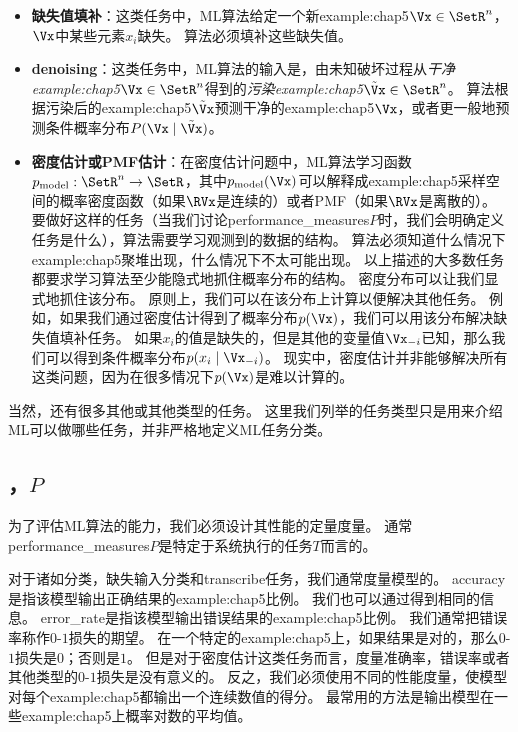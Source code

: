 \begin{itemize}
    \item \textbf{缺失值填补}：这类任务中，\gls{ML}算法给定一个新\gls{example:chap5}$\Vx\in\SetR^n$，$\Vx$中某些元素$x_i$缺失。
    算法必须填补这些缺失值。


    \item \textbf{\gls{denoising}}：这类任务中，\gls{ML}算法的输入是，由未知破坏过程从\emph{干净\gls{example:chap5}}$\Vx \in \SetR^n$得到的\emph{污染\gls{example:chap5}}$\tilde{\Vx} \in \SetR^n$。
    算法根据污染后的\gls{example:chap5}$\tilde{\Vx}$预测干净的\gls{example:chap5}$\Vx$，或者更一般地预测条件概率分布$P(\Vx\mid\tilde{\Vx})$。
    
    \item \textbf{密度估计}\textbf{或}\textbf{\gls{PMF}估计}：在密度估计问题中，\gls{ML}算法学习函数$p_{\text{model}}:\SetR^n \to \SetR$，其中$p_{\text{model}}(\Vx)$可以解释成\gls{example:chap5}采样空间的概率密度函数（如果$\RVx$是连续的）或者\gls{PMF}（如果$\RVx$是离散的）。
    要做好这样的任务（当我们讨论\gls{performance_measures}$P$时，我们会明确定义任务是什么），算法需要学习观测到的数据的结构。
    算法必须知道什么情况下\gls{example:chap5}聚堆出现，什么情况下不太可能出现。
    以上描述的大多数任务都要求学习算法至少能隐式地抓住概率分布的结构。
    密度分布可以让我们显式地抓住该分布。
    原则上，我们可以在该分布上计算以便解决其他任务。
    例如，如果我们通过密度估计得到了概率分布$p(\Vx)$，我们可以用该分布解决缺失值填补任务。
    如果$x_i$的值是缺失的，但是其他的变量值$\Vx_{-i}$已知，那么我们可以得到条件概率分布$p(x_i\mid\Vx_{-i})$。
    现实中，密度估计并非能够解决所有这类问题，因为在很多情况下$p(\Vx)$是难以计算的。
\end{itemize}

当然，还有很多其他或其他类型的任务。
这里我们列举的任务类型只是用来介绍\gls{ML}可以做哪些任务，并非严格地定义\gls{ML}任务分类。

\subsection{，$P$}
\label{sec:the_performance_measure_p}
为了评估\gls{ML}算法的能力，我们必须设计其性能的定量度量。
通常\gls{performance_measures}$P$是特定于系统执行的任务$T$而言的。

对于诸如分类，缺失输入分类和\gls{transcribe}任务，我们通常度量模型的。
\gls{accuracy}是指该模型输出正确结果的\gls{example:chap5}比例。
我们也可以通过得到相同的信息。
\gls{error_rate}是指该模型输出错误结果的\gls{example:chap5}比例。
我们通常把错误率称作$0$-$1$损失的期望。
在一个特定的\gls{example:chap5}上，如果结果是对的，那么$0$-$1$损失是$0$；否则是$1$。
但是对于密度估计这类任务而言，度量准确率，错误率或者其他类型的$0$-$1$损失是没有意义的。
反之，我们必须使用不同的性能度量，使模型对每个\gls{example:chap5}都输出一个连续数值的得分。
最常用的方法是输出模型在一些\gls{example:chap5}上概率对数的平均值。


